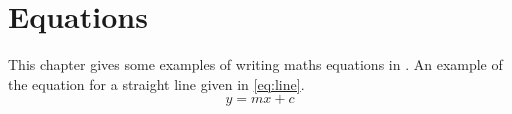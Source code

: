 \chapter{Equations} %
\label{ch:3} %
This chapter gives some examples of writing maths equations in \LaTeXe.
An example of the equation for a straight line given in \cref{eq:line}.
\begin{equation}
y = mx +c
\label{eq:line}
\end{equation}

